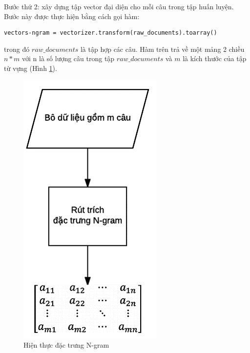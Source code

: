 Bước thứ 2: xây dựng tập vector đại diện cho mỗi câu trong tập huấn luyện. Bước này được thực hiện bằng cách gọi hàm:
\begin{lstlisting}
vectors-ngram = vectorizer.transform(raw_documents).toarray()
\end{lstlisting}
trong đó $raw\_documents$ là tập hợp các câu. Hàm trên trả về một mảng 2 chiều $n*m$ với n là số lượng câu trong tập $raw\_documents$ và $m$ là kích thước của tập từ vựng (Hình \ref{fig:hien-thuc-ngram}).
\begin{figure}[h]
\centering
\includegraphics[scale=0.5]{../hinh/hien_thuc_ngram.png}
\caption{Hiện thực đặc trưng N-gram} \label{fig:hien-thuc-ngram}
\end{figure}
